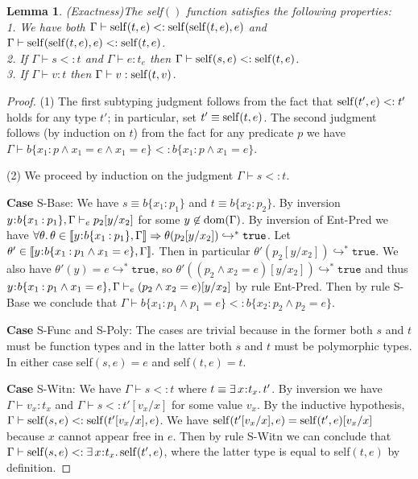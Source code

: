 \documentclass[11pt]{article}
\newtheorem{lemma}[theorem]{Lemma}
\newcommand{\bind}{\hspace{0.05em}{:}\hspace{0.05em}} %
\newcommand{\col}{\mathbin{:}}       %
\newcommand{\lb}{\llbracket}         %
\newcommand{\rb}{\rrbracket}         %
\newcommand{\many}{\hookrightarrow^*}
\newcommand{\true}{\mathtt{true}}
\newcommand{\existype}[3]{\exists\, #1\bind #2.\, #3}
\newcommand{\dom}[1]{{\rm dom}(#1)}
\begin{document}
\begin{lemma}(Exactness)\label{exactness} The self$()$ function satisfies the following properties:\\
1. We have both $\Gamma\vdash {\rm self}(t,e) <: {\rm self}({\rm self}(t,e),e)$ and $\Gamma\vdash {\rm self}({\rm self}(t,e),e) <: {\rm self}(t,e)$.\\
2. If $\Gamma \vdash s <: t$ and $\Gamma\vdash e : t_e$ then $\Gamma \vdash {\rm self}(s,e) <: {\rm self}(t,e)$. \\
3. If $\Gamma \vdash v : t$ then $\Gamma \vdash v : {\rm self}(t,v)$.
\end{lemma}
\begin{proof}
(1) The first subtyping judgment follows from the fact that ${\rm self}(t',e) <: t'$ holds for any type $t'$; in particular, set $t' \equiv {\rm self}(t,e)$. The second judgment follows (by induction on $t$) from the fact for any predicate $p$ we have $\Gamma \vdash b\{x_1\col p \wedge x_1 = e \wedge x_1 = e\} <: b\{x_1\col p \wedge x_1 = e\}$.

(2) We proceed by induction on the judgment $\Gamma\vdash s <: t$.

{\bf Case} {\sc S-Base}: We have $s\equiv b\{x_1\col p_1\}$ and $t\equiv b\{x_2\col p_2\}$. By inversion $y\bind b\{x_1\col p_1\},\Gamma \vdash_e p_2[y/x_2]$ for some $y\not\in\dom{\Gamma}$. By inversion of {\sc Ent-Pred} we have $\forall \theta.\,\theta\in\lb y\bind b\{x_1\col p_1\},\Gamma \rb \Rightarrow \theta(p_2[y/x_2]) \many \true$. Let $\theta'\in\lb y\bind b\{x_1\col p_1\wedge x_1 = e\}, \Gamma\rb.$ Then in particular $\theta'(p_2[y/x_2]) \many \true$. We also have $\theta'(y) = e \many \true$, so $\theta'((p_2 \wedge x_2 = e)[y/x_2]) \many \true$ and thus $y\bind b\{x_1\col p_1 \wedge x_1 = e\},\Gamma \vdash_e (p_2 \wedge x_2 = e)[y/x_2]$ by rule {\sc Ent-Pred}. Then by rule {\sc S-Base} we conclude that $\Gamma \vdash b\{x_1\col p_1 \wedge p_1 = e\} <: b\{x_2\col p_2 \wedge p_2=e\}$.

{\bf Case} {\sc S-Func} and {\sc S-Poly}: The cases are trivial because in the former both $s$ and $t$ must be function types and in the latter both $s$ and $t$ must be polymorphic types. In either case self$(s,e)=e$ and self$(t,e) = t$.

{\bf Case} {\sc S-Witn}: We have $\Gamma \vdash s <: t$ where $t\equiv \existype{x}{t_x}{t'}$. By inversion we have $\Gamma \vdash v_x : t_x$ and $\Gamma \vdash s <: t'[v_x/x]$ for some value $v_x$. By the inductive hypothesis, $\Gamma \vdash {\rm self}(s,e) <: {\rm self}(t'[v_x/x], e)$. We have ${\rm self}(t'[v_x/x],e) = {\rm self}(t', e)[v_x/x]$ because $x$ cannot appear free in $e$. Then by rule {\sc S-Witn} we can conclude that $\Gamma \vdash {\rm self}(s,e) <: \existype{x}{t_x}{{\rm self}(t', e)}$, where the latter type is equal to self$(t,e)$ by definition.


\end{proof}
\end{document}
